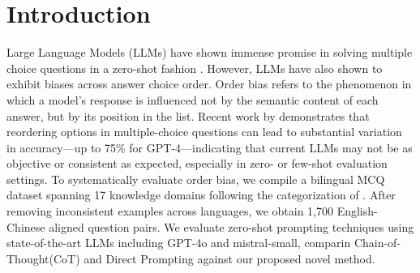 \section{Introduction}
\label{sec:intro}

Large Language Models (LLMs) have shown immense promise in solving multiple choice questions in a zero-shot fashion \citep{kojima2022large}. However, LLMs have also shown to exhibit biases across answer choice order. Order bias refers to the phenomenon in which a model's response is influenced not by the semantic content of each answer, but by its position in the list. 
Recent work by \citet{pezeshkpour2023optionorder} demonstrates that reordering options in multiple-choice questions can lead to substantial variation in accuracy—up to 75\% for GPT-4—indicating that current LLMs may not be as objective or consistent as expected, especially in zero- or few-shot evaluation settings.
To systematically evaluate order bias, we compile a bilingual MCQ dataset spanning 17 knowledge domains following the categorization of \citet{hendryckstest2021}. After removing inconsistent examples across languages, we obtain 1,700 English-Chinese aligned question pairs. We evaluate zero-shot prompting techniques using state-of-the-art LLMs including GPT-4o and mistral-small, comparin Chain-of-Thought(CoT) and Direct Prompting against our proposed novel method.